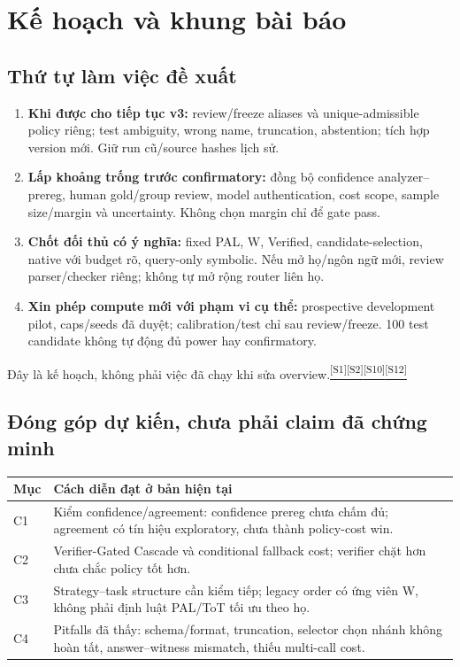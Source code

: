 \documentclass[11pt,a4paper]{article}
\newcommand{\src}[1]{\hyperlink{src-#1}{\textcolor{muted}{\textsuperscript{[S#1]}}}}
\begin{document}
\section{Kế hoạch và khung bài báo}
\subsection{Thứ tự làm việc đề xuất}
\begin{enumerate}
  \item \textbf{Khi được cho tiếp tục v3:} review/freeze aliases và unique-admissible policy riêng; test ambiguity, wrong name, truncation, abstention; tích hợp version mới. Giữ run cũ/source hashes lịch sử.
  \item \textbf{Lấp khoảng trống trước confirmatory:} đồng bộ confidence analyzer--prereg, human gold/group review, model authentication, cost scope, sample size/margin và uncertainty. Không chọn margin chỉ để gate pass.
  \item \textbf{Chốt đối thủ có ý nghĩa:} fixed PAL, W, Verified, candidate-selection, native với budget rõ, query-only symbolic. Nếu mở họ/ngôn ngữ mới, review parser/checker riêng; không tự mở rộng router liên họ.
  \item \textbf{Xin phép compute mới với phạm vi cụ thể:} prospective development pilot, caps/seeds đã duyệt; calibration/test chỉ sau review/freeze. 100 test candidate không tự động đủ power hay confirmatory.
\end{enumerate}
Đây là kế hoạch, không phải việc đã chạy khi sửa overview.\src{1}\src{2}\src{10}\src{12}

\subsection{Đóng góp dự kiến, chưa phải claim đã chứng minh}
\begin{tabularx}{\textwidth}{@{}p{12mm}Y@{}}
\toprule
\textbf{Mục} & \textbf{Cách diễn đạt ở bản hiện tại}\\
\midrule
C1 & Kiểm confidence/agreement: confidence prereg chưa chấm đủ; agreement có tín hiệu exploratory, chưa thành policy-cost win.\\
C2 & Verifier-Gated Cascade và conditional fallback cost; verifier chặt hơn chưa chắc policy tốt hơn.\\
C3 & Strategy--task structure cần kiểm tiếp; legacy order có ứng viên W, không phải định luật PAL/ToT tối ưu theo họ.\\
C4 & Pitfalls đã thấy: schema/format, truncation, selector chọn nhánh không hoàn tất, answer--witness mismatch, thiếu multi-call cost.\\
\bottomrule
\end{tabularx}
\end{document}
